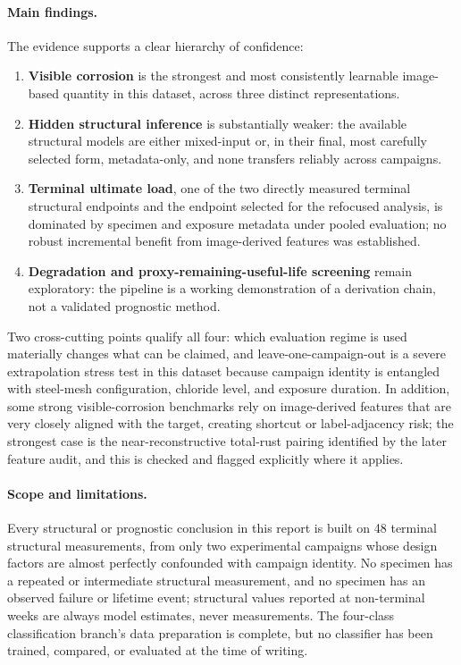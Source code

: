 \paragraph{Main findings.} The evidence supports a clear hierarchy of
confidence:
\begin{enumerate}
\item \textbf{Visible corrosion} is the strongest and most consistently
learnable image-based quantity in this dataset, across three distinct
representations.
\item \textbf{Hidden structural inference} is substantially weaker: the
available structural models are either mixed-input or, in their final,
most carefully selected form, metadata-only, and none transfers reliably
across campaigns.
\item \textbf{Terminal ultimate load}, one of the two directly measured
terminal structural endpoints and the endpoint selected for the
refocused analysis, is dominated by specimen and exposure metadata under
pooled evaluation; no robust incremental benefit from image-derived
features was established.
\item \textbf{Degradation and proxy-remaining-useful-life screening}
remain exploratory: the pipeline is a working demonstration of a
derivation chain, not a validated prognostic method.
\end{enumerate}
Two cross-cutting points qualify all four: which evaluation regime is used
materially changes what can be claimed, and leave-one-campaign-out is a
severe extrapolation stress test in this dataset because campaign identity
is entangled with steel-mesh configuration, chloride level, and exposure
duration. In addition, some strong visible-corrosion benchmarks rely on
image-derived features that are very closely aligned with the target,
creating shortcut or label-adjacency risk; the strongest case is the
near-reconstructive total-rust pairing identified by the later feature
audit, and this is checked and flagged explicitly where it applies.

\paragraph{Scope and limitations.} Every structural or prognostic
conclusion in this report is built on 48 terminal structural
measurements, from only two experimental campaigns whose design factors
are almost perfectly confounded with campaign identity. No specimen has a
repeated or intermediate structural measurement, and no specimen has an
observed failure or lifetime event; structural values reported at
non-terminal weeks are always model estimates, never measurements. The
four-class classification branch's data preparation is complete, but no
classifier has been trained, compared, or evaluated at the time of
writing.

